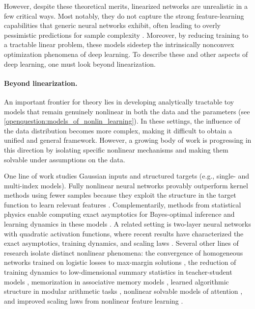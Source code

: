 However, despite these theoretical merits, linearized networks are unrealistic in a few critical ways.
Most notably, they do not capture the strong feature-learning capabilities that generic neural networks exhibit, often leading to overly pessimistic predictions for sample complexity \citep{ghorbani2020neural,vyas2022limitations}.
Moreover, by reducing training to a tractable linear problem, these models sidestep the intrinsically nonconvex optimization phenomena of deep learning.
To describe these and other aspects of deep learning, one must look beyond linearization.

\paragraph{Beyond linearization.}
An important frontier for theory lies in developing analytically tractable toy models that remain genuinely nonlinear in both the data and the parameters (see \cref{openquestion:models_of_nonlin_learning}).
In these settings, the influence of the data distribution becomes more complex, making it difficult to obtain a unified and general framework.
However, a growing body of work is progressing in this direction by isolating specific nonlinear mechanisms and making them solvable under assumptions on the data.

One line of work studies Gaussian inputs and structured targets (e.g., single- and multi-index models). Fully nonlinear neural networks provably outperform kernel methods using fewer samples because they exploit the structure in the target function to learn relevant features \citep{abbe2022merged, damian2022neural, bietti2022learning, ba2022high, dandi2023two}. Complementarily, methods from statistical physics enable computing exact asymptotics for Bayes-optimal inference and learning dynamics in these models \citep{barbier2019optimal, aubin2018committee, mignacco2020dynamical}. A related setting is two-layer neural networks with quadratic activation functions, where recent results have characterized the exact asymptotics, training dynamics, and scaling laws \citep{erba2025nuclear, arous2025learning, defilippis2025scaling, ren2025emergence}. Several other lines of research isolate distinct nonlinear phenomena: the convergence of homogeneous networks trained on logistic losses to max-margin solutions \citep{soudry2018implicit, lyu2020gradient}, the reduction of training dynamics to low-dimensional summary statistics in teacher-student models \citep{saad1995exact, goldt2019dynamics, ben2022high, veiga2022phase, zavatone2025summary}, memorization in associative memory models \citep{nichani2025understanding}, learned algorithmic structure in modular arithmetic tasks \citep{morwani2023feature, gromov2023grokking, kunin2025alternating}, nonlinear solvable models of attention \citep{zhang2025training, boncoraglio2025singlehead},
and improved scaling laws from nonlinear feature learning \citep{bordelon2025feature}.

